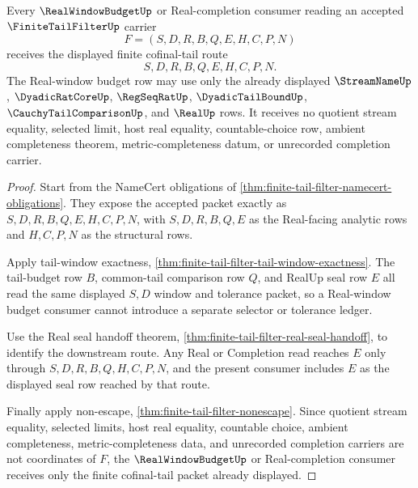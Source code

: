 \begin{theorem}
\label{thm:finite-tail-filter-real-window-consumer}
Every $\RealWindowBudgetUp$ or Real-completion consumer reading an accepted $\FiniteTailFilterUp$ carrier
$$
F=(S,D,R,B,Q,E,H,C,P,N)
$$
receives the displayed finite cofinal-tail route
$$
S,D,R,B,Q,E,H,C,P,N.
$$
The Real-window budget row may use only the already displayed $\StreamNameUp$, $\DyadicRatCoreUp$, $\RegSeqRatUp$, $\DyadicTailBoundUp$, $\CauchyTailComparisonUp$, and $\RealUp$ rows. It receives no quotient stream equality, selected limit, host real equality, countable-choice row, ambient completeness theorem, metric-completeness datum, or unrecorded completion carrier.
\end{theorem}
\begin{proof}
Start from the NameCert obligations of \autoref{thm:finite-tail-filter-namecert-obligations}. They expose the accepted packet exactly as $S,D,R,B,Q,E,H,C,P,N$, with $S,D,R,B,Q,E$ as the Real-facing analytic rows and $H,C,P,N$ as the structural rows.

Apply tail-window exactness, \autoref{thm:finite-tail-filter-tail-window-exactness}. The tail-budget row $B$, common-tail comparison row $Q$, and RealUp seal row $E$ all read the same displayed $S,D$ window and tolerance packet, so a Real-window budget consumer cannot introduce a separate selector or tolerance ledger.

Use the Real seal handoff theorem, \autoref{thm:finite-tail-filter-real-seal-handoff}, to identify the downstream route. Any Real or Completion read reaches $E$ only through $S,D,R,B,Q,H,C,P,N$, and the present consumer includes $E$ as the displayed seal row reached by that route.

Finally apply non-escape, \autoref{thm:finite-tail-filter-nonescape}. Since quotient stream equality, selected limits, host real equality, countable choice, ambient completeness, metric-completeness data, and unrecorded completion carriers are not coordinates of $F$, the $\RealWindowBudgetUp$ or Real-completion consumer receives only the finite cofinal-tail packet already displayed.
\end{proof}

